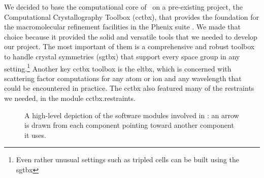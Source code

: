 \documentclass[pdf]{iucr}
\begin{document}
We decided to base the computational core of \olexrefine\ on a pre-existing project, the Computational Crystallography Toolbox (cctbx), that provides the foundation for the macromolecular refinement facilities in the Phenix suite . We made that choice because it provided the solid and versatile tools  that we needed to develop our project. The most important of them is a comprehensive and robust toolbox to handle crystal symmetries (sgtbx) that support every space group in any setting.\footnote{Even rather unusual settings such as tripled cells can be built using the sgtbx} Another key cctbx toolbox is the eltbx, which is concerned with scattering factor computations for any atom or ion and any wavelength that could be encountered in practice. The cctbx also featured many of the restraints we needed, in the module cctbx.restraints. 

\begin{figure}
\caption{A high-level depiction of the software modules involved in \olexrefine: an arrow is drawn from each component pointing toward another component it uses.}
\label{fig:software:modules}
\end{figure}
\end{document}
